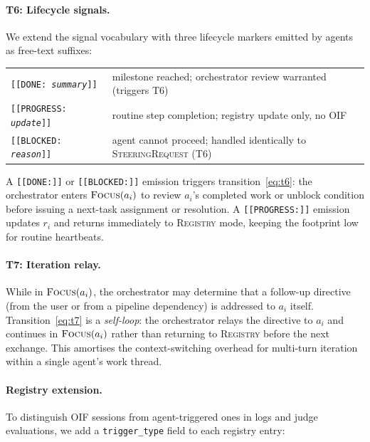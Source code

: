 \documentclass{article}
\begin{document}
\paragraph{T6: Lifecycle signals.}
We extend the signal vocabulary with three lifecycle markers emitted by
agents as free-text suffixes:

\begin{center}
\small
\begin{tabular}{ll}
\texttt{[[DONE: \textit{summary}]]}     & milestone reached; orchestrator review warranted (triggers T6) \\
\texttt{[[PROGRESS: \textit{update}]]} & routine step completion; registry update only, no OIF \\
\texttt{[[BLOCKED: \textit{reason}]]}  & agent cannot proceed; handled identically to
                                         \textsc{SteeringRequest} (T6) \\
\end{tabular}
\end{center}

A \texttt{[[DONE:]]} or \texttt{[[BLOCKED:]]} emission triggers
transition~\eqref{eq:t6}: the orchestrator enters $\textsc{Focus}(a_i)$
to review $a_i$'s completed work or unblock condition before issuing a
next-task assignment or resolution.
A \texttt{[[PROGRESS:]]} emission updates $r_i$ and returns immediately
to \textsc{Registry} mode, keeping the footprint low for routine
heartbeats.

\paragraph{T7: Iteration relay.}
While in $\textsc{Focus}(a_i)$, the orchestrator may determine that a
follow-up directive (from the user or from a pipeline dependency) is
addressed to $a_i$ itself.
Transition~\eqref{eq:t7} is a \emph{self-loop}: the orchestrator relays
the directive to $a_i$ and continues in $\textsc{Focus}(a_i)$ rather
than returning to \textsc{Registry} before the next exchange.
This amortises the context-switching overhead for multi-turn iteration
within a single agent's work thread.

\paragraph{Registry extension.}
To distinguish OIF sessions from agent-triggered ones in logs and judge
evaluations, we add a \texttt{trigger\_type} field to each registry entry:
\end{document}
